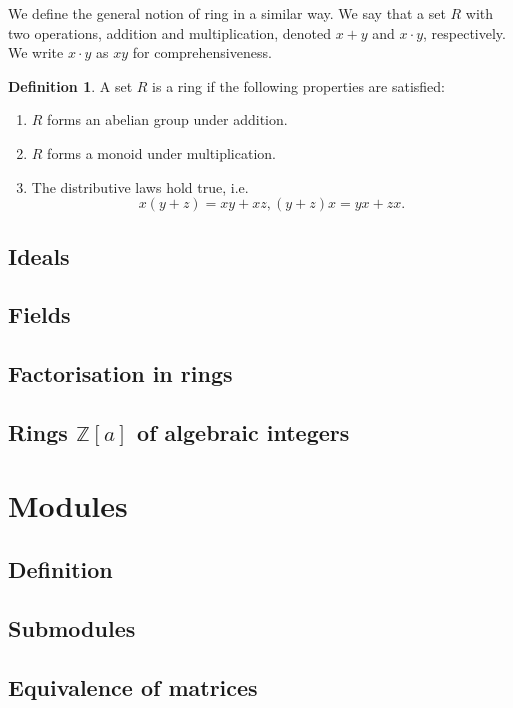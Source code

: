 \documentclass[12pt]{book}
\newcommand{\ZZ}{\mathbb Z}
\theoremstyle{definition}
\newtheorem{definition}{Definition}[section]
\theoremstyle{remark}
\begin{document}
			We define the general notion of ring in a similar way. We say that a set $R$ with two operations, addition and multiplication, denoted $x + y$ and $x \cdot y$, respectively.
			We write $x \cdot y$ as $xy$ for comprehensiveness.
			\begin{definition}
				A set $R$ is a ring if the following properties are satisfied:
				\begin{enumerate}
					\item $R$ forms an abelian group under addition.
					\item $R$ forms a monoid under multiplication.
					\item The distributive laws hold true, i.e.
					\begin{equation*}
						x(y + z) = xy + xz, (y + z)x = yx + zx.
					\end{equation*}
				\end{enumerate}
			\end{definition}
			\subsection{Ideals}
			
			\subsection{Fields}
			
			\subsection{Factorisation in rings}
			
			\subsection{Rings $\ZZ[a]$ of algebraic integers}
		\section{Modules}
			\subsection{Definition}
			
			\subsection{Submodules}
			
			\subsection{Equivalence of matrices}
			
\end{document}
